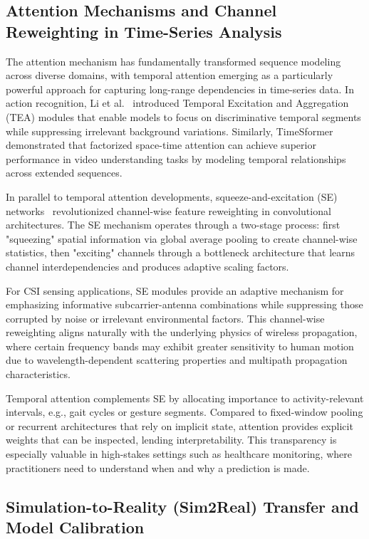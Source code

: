 \documentclass[journal]{IEEEtran}
\begin{document}
\subsection{Attention Mechanisms and Channel Reweighting in Time-Series Analysis}

The attention mechanism has fundamentally transformed sequence modeling across diverse domains, with temporal attention emerging as a particularly powerful approach for capturing long-range dependencies in time-series data. In action recognition, Li et al.~\cite{li2020tea} introduced Temporal Excitation and Aggregation (TEA) modules that enable models to focus on discriminative temporal segments while suppressing irrelevant background variations. Similarly, TimeSformer~\cite{bertasius2021timesformer} demonstrated that factorized space-time attention can achieve superior performance in video understanding tasks by modeling temporal relationships across extended sequences.

In parallel to temporal attention developments, squeeze-and-excitation (SE) networks~\cite{se_networks2018} revolutionized channel-wise feature reweighting in convolutional architectures. The SE mechanism operates through a two-stage process: first "squeezing" spatial information via global average pooling to create channel-wise statistics, then "exciting" channels through a bottleneck architecture that learns channel interdependencies and produces adaptive scaling factors.

For CSI sensing applications, SE modules provide an adaptive mechanism for emphasizing informative subcarrier-antenna combinations while suppressing those corrupted by noise or irrelevant environmental factors. This channel-wise reweighting aligns naturally with the underlying physics of wireless propagation, where certain frequency bands may exhibit greater sensitivity to human motion due to wavelength-dependent scattering properties and multipath propagation characteristics.

Temporal attention complements SE by allocating importance to activity-relevant intervals, e.g., gait cycles or gesture segments. Compared to fixed-window pooling or recurrent architectures that rely on implicit state, attention provides explicit weights that can be inspected, lending interpretability. This transparency is especially valuable in high-stakes settings such as healthcare monitoring, where practitioners need to understand when and why a prediction is made.

\subsection{Simulation-to-Reality (Sim2Real) Transfer and Model Calibration}
\end{document}
